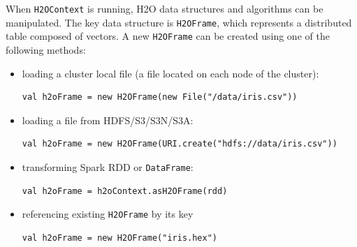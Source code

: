 \documentclass{standalone}
\begin{document}
When \texttt{H2OContext} is running, H2O data structures and algorithms can be manipulated. The key data structure is \texttt{H2OFrame}, which represents a distributed table composed of vectors. A new \texttt{H2OFrame} can be created using one of the following methods:
\begin{itemize}
	\item loading a cluster local file (a file located on each node of the cluster):
\begin{lstlisting}[style=Scala]
val h2oFrame = new H2OFrame(new File("/data/iris.csv"))
\end{lstlisting}
	\item loading a file from HDFS/S3/S3N/S3A:
\begin{lstlisting}[style=Scala]
val h2oFrame = new H2OFrame(URI.create("hdfs://data/iris.csv"))
\end{lstlisting}
	\item transforming Spark RDD or \texttt{DataFrame}:
\begin{lstlisting}[style=Scala]
val h2oFrame = h2oContext.asH2OFrame(rdd)
\end{lstlisting}
	\item referencing existing \texttt{H2OFrame} by its key
\begin{lstlisting}[style=Scala]
val h2oFrame = new H2OFrame("iris.hex")
\end{lstlisting}		
\end{itemize}
\end{document}
